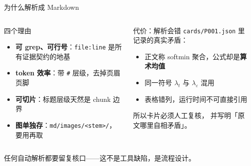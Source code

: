 \begin{frame}{为什么解析成 Markdown}
  \vspace{-2pt}
  \begin{columns}[T]
    \footnotesize
    \begin{block}{四个理由}
      \begin{itemize}
        \item \textbf{可 grep、可行号}：\texttt{file:line} 是所有证据契约的地基
        \item \textbf{token 效率}：带 \texttt{\#} 层级，去掉页眉页脚
        \item \textbf{可切片}：标题层级天然是 chunk 边界
        \item \textbf{图单独存}：\texttt{md/images/<stem>/}，要用再取
      \end{itemize}
    \end{block}

    \footnotesize
    \begin{alertblock}{代价：解析会错}
      \scriptsize
      \texttt{cards/P001.json} 里记录的真实矛盾：
      \begin{itemize}
        \item 正文称 softmin 聚合，公式却是\textbf{算术均值}
        \item 同一符号 $\lambda_t$ 与 $\lambda_\varepsilon$ 混用
        \item 表格错列，运行时间不可直接引用
      \end{itemize}
      \vspace{0.3em}
      所以卡片必须人工复核，
      并写明「原文哪里自相矛盾」。
    \end{alertblock}
  \end{columns}

  \vspace{0.6em}
  {\footnotesize 任何自动解析都要留复核口——这不是工具缺陷，是流程设计。}
\end{frame}

